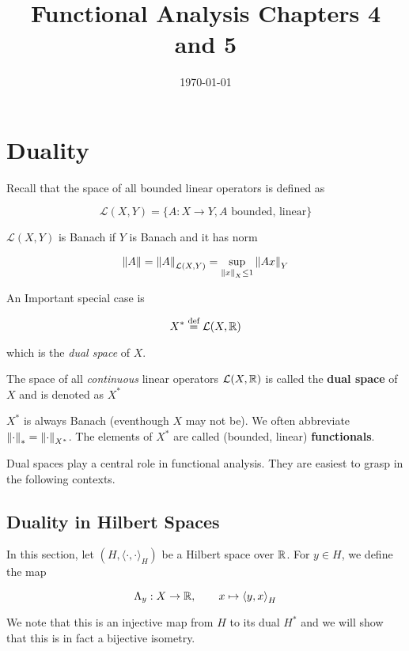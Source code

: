 \documentclass{article}
\title{Functional Analysis Chapters 4 and 5}
\date{\today}
\begin{document}
\maketitle

\section{Duality}  

Recall that the space of all bounded linear operators is defined as

\[
\mathcal{L}(X,Y) = \{A: X \to Y, A \textrm{ bounded, linear}\}
\] 
 
\(\mathcal{L}(X,Y)\) is Banach if  \(Y\) is Banach and it has norm  

\[
\left\|{A}\right\| = \left\|{A}\right\|_{\mathcal{L}(X,Y)} = \sup_{\left\|{x}\right\|_X \leq 1} \left\|{Ax}\right\|_Y
\]  

An Important special case is  

\[
X^* \overset{\textrm{def}}{=} \mathcal{L}(X,\mathbb{R})
\]  

which is the \textit{dual space} of  \(X\).  

\begin{definition}\nextline
    The space of all \textit{continuous} linear operators  \(\mathcal{L}(X, \mathbb{R})\) is called the \textbf{dual space} of  \(X\) and is denoted as   \(X^*\)
\end{definition}  

\begin{remark}
     \(X^*\) is always Banach (eventhough  \(X\) may not be). We often abbreviate  \(\left\|{\cdot}\right\|_* = \left\|{\cdot}\right\|_{X^*}\). The elements of  \(X^*\) are called (bounded, linear) \textbf{functionals}.
\end{remark}

Dual spaces play a central role in functional analysis. They are easiest to grasp in the following contexts.  

\subsection{Duality in Hilbert Spaces}  
In this section, let  \((H, {\langle \cdot, \cdot \rangle}_H )\) be a Hilbert space over  \(\mathbb{R}\). For  \(y\in H\), we define the map  

\begin{equation*}
    \Lambda_y: X \to \mathbb{R}, \qquad x \mapsto {\langle y, x \rangle}_H
\end{equation*}  

We note that this is an injective map from  \(H\) to its dual  \(H^*\) and we will show that this is in fact a bijective isometry.  
\end{document}
